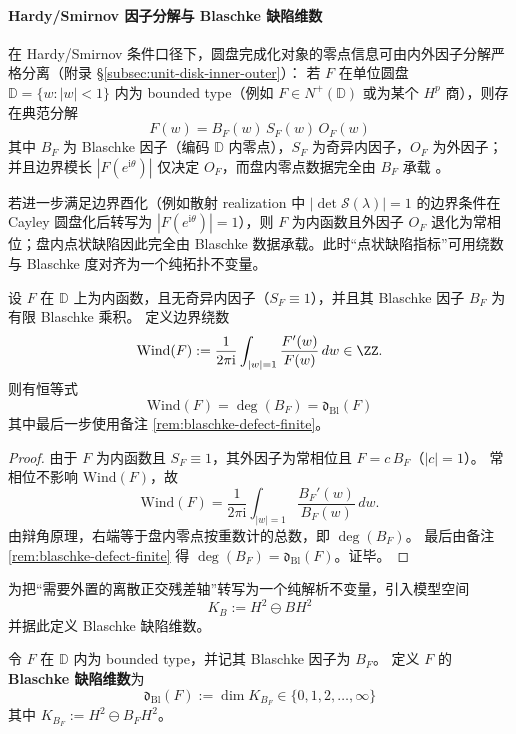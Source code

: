 \paragraph{Hardy/Smirnov 因子分解与 Blaschke 缺陷维数}
在 Hardy/Smirnov 条件口径下，圆盘完成化对象的零点信息可由内外因子分解严格分离（附录 \S\ref{subsec:unit-disk-inner-outer}）：
若 \(F\) 在单位圆盘 \(\mathbb{D}=\{w:|w|<1\}\) 内为 bounded type（例如 \(F\in N^+(\mathbb{D})\) 或为某个 \(H^p\) 商），则存在典范分解
\[
\boxed{\;F(w)=B_F(w)\,S_F(w)\,O_F(w)\;}
\]
其中 \(B_F\) 为 Blaschke 因子（编码 \(\mathbb{D}\) 内零点），\(S_F\) 为奇异内因子，\(O_F\) 为外因子；并且边界模长 \(|F(e^{\mathrm{i}\theta})|\) 仅决定 \(O_F\)，而盘内零点数据完全由 \(B_F\) 承载 \cite{Duren1970TheoryHp,Garnett2007BoundedAnalyticFunctions}。
\par
若进一步满足边界酉化（例如散射 realization 中 \(|\det\mathcal S(\lambda)|=1\) 的边界条件在 Cayley 圆盘化后转写为 \(|F(e^{\mathrm{i}\theta})|=1\)），则 \(F\) 为内函数且外因子 \(O_F\) 退化为常相位；盘内点状缺陷因此完全由 Blaschke 数据承载。此时“点状缺陷指标”可用绕数与 Blaschke 度对齐为一个纯拓扑不变量。

\begin{proposition}[绕数=\texorpdfstring{$\deg(B_F)$}{deg(B)}（有限 Blaschke/无奇异内因子口径）]\label{prop:winding-equals-blaschke-degree}
设 \(F\) 在 \(\mathbb{D}\) 上为内函数，且无奇异内因子（\(S_F\equiv 1\)），并且其 Blaschke 因子 \(B_F\) 为有限 Blaschke 乘积。
定义边界绕数
\[
\mathrm{Wind}(F):=\frac{1}{2\pi\mathrm{i}}\int_{|w|=1}\frac{F'(w)}{F(w)}\,dw\in\ZZ.
\]
则有恒等式
\[
\boxed{\;\mathrm{Wind}(F)=\deg(B_F)=\mathfrak d_{\mathrm{Bl}}(F)\;}
\]
其中最后一步使用备注 \ref{rem:blaschke-defect-finite}。
\end{proposition}

\begin{proof}
由于 \(F\) 为内函数且 \(S_F\equiv 1\)，其外因子为常相位且 \(F=c\,B_F\)（\(|c|=1\)）。
常相位不影响 \(\mathrm{Wind}(F)\)，故
\[
\mathrm{Wind}(F)=\frac{1}{2\pi\mathrm{i}}\int_{|w|=1}\frac{B_F'(w)}{B_F(w)}\,dw.
\]
由辩角原理，右端等于盘内零点按重数计的总数，即 \(\deg(B_F)\)。
最后由备注 \ref{rem:blaschke-defect-finite} 得 \(\deg(B_F)=\mathfrak d_{\mathrm{Bl}}(F)\)。证毕。
\end{proof}
\par
为把“需要外置的离散正交残差轴”转写为一个纯解析不变量，引入模型空间
\[
K_B:=H^2\ominus BH^2
\]
并据此定义 Blaschke 缺陷维数。

\begin{definition}\label{def:blaschke-defect-dimension}
令 \(F\) 在 \(\mathbb{D}\) 内为 bounded type，并记其 Blaschke 因子为 \(B_F\)。
定义 \(F\) 的\textbf{Blaschke 缺陷维数}为
\[
\boxed{\;\mathfrak{d}_{\mathrm{Bl}}(F):=\dim K_{B_F}\in\{0,1,2,\dots,\infty\}\;}
\]
其中 \(K_{B_F}:=H^2\ominus B_FH^2\)。
\end{definition}

